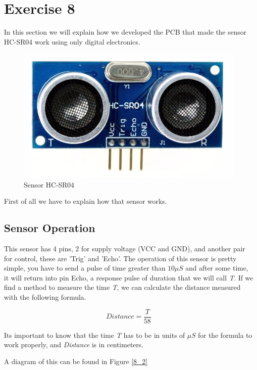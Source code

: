 
\section{Exercise 8}

In this section we will explain how we developed the PCB that made
the sensor HC-SR04 work using only digital electronics. 

\begin{figure}[H]
\begin{centering}
\includegraphics[scale=0.2]{images/HC-SR04}
\par\end{centering}
\caption{Sensor HC-SR04}
\end{figure}

First of all we have to explain how that sensor works.

\subsection{Sensor Operation}

This sensor has 4 pins, 2 for supply voltage (VCC and GND), and another
pair for control, these are 'Trig' and 'Echo'. The operation of this
sensor is pretty simple, you have to send a pulse of time greater
than $10\mu S$ and after some time, it will return into pin Echo,
a response pulse of duration that we will call \emph{T}. If we find
a method to measure the time \emph{T}, we can calculate the distance
measured with the following formula.

\[
Distance=\frac{T}{58}
\]

Its important to know that the time \emph{T }has to be in units of
$\mu S$ for the formula to work properly, and \emph{Distance }is
in centimeters.

A diagram of this can be found in Figure \ref{8_2}

